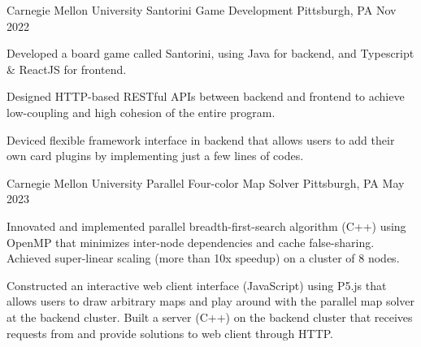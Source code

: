 \begin{cventries}
  \cventry
    {Carnegie Mellon University} %
    {Santorini Game Development} %
    {Pittsburgh, PA} %
    {Nov 2022} %
    {
      \begin{cvitems} %
        \item {Developed a board game called Santorini, using Java for backend, and Typescript \& ReactJS for 
        frontend.}
        \item {Designed HTTP-based RESTful APIs between backend and frontend to achieve low-coupling and 
        high cohesion of the entire program.}
        \item {Deviced flexible framework interface in backend that allows users to add their own card plugins 
        by implementing just a few lines of codes.}
      \end{cvitems}
    }

    \cventry
    {Carnegie Mellon University} %
    {Parallel Four-color Map Solver} %
    {Pittsburgh, PA} %
    {May 2023} %
    {
      \begin{cvitems} %
        \item {Innovated and implemented parallel breadth-first-search algorithm (C++) using OpenMP that minimizes 
        inter-node dependencies and cache false-sharing. Achieved super-linear scaling (more than 10x speedup) on 
        a cluster of 8 nodes.}
        \item {Constructed an interactive web client interface (JavaScript) using P5.js that allows users to draw 
        arbitrary maps and play around with the parallel map solver at the backend cluster. Built a server (C++) 
        on the backend cluster that receives requests from and provide solutions to web client through HTTP.}
      \end{cvitems}
      }

\end{cventries}